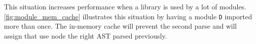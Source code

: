 This situation increases performance when a library is used by a lot of modules.
\autoref{fig:module_mem_cache} illustrates this situation by having a module \texttt{D} imported more than once. The in-memory cache will prevent the second
parse and will assign that use node the right AST parsed previously.
